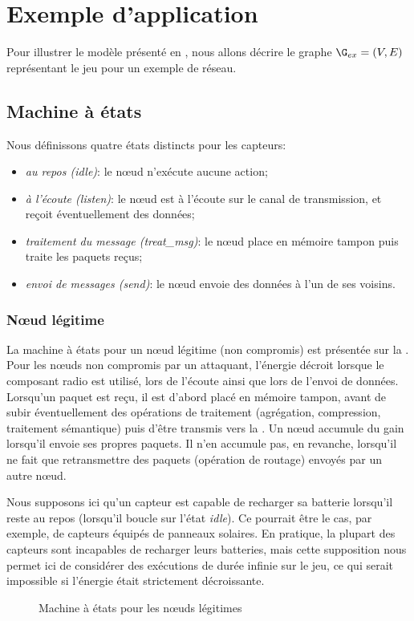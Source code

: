 \section{Exemple d'application}
\label{tj:sec:example}
Pour illustrer le modèle présenté en , nous allons décrire le graphe $\G_{ex} = (V,E)$ représentant le jeu pour un exemple de réseau.

    \subsection{Machine à états}

Nous définissons quatre états distincts pour les capteurs:
\begin{itemize}
    \item \emph{au repos (idle)}: le nœud n'exécute aucune action;
    \item \emph{à l'écoute (listen)}: le nœud est à l'écoute sur le canal de transmission, et reçoit éventuellement des données;
    \item \emph{traitement du message (treat\_msg)}: le nœud place en mémoire tampon puis traite les paquets reçus;
    \item \emph{envoi de messages (send)}: le nœud envoie des données à l'un de ses voisins.
\end{itemize}

        \subsubsection{Nœud légitime}
La machine à états pour un nœud légitime (non compromis) est présentée sur la .
Pour les nœuds non compromis par un attaquant, l'énergie décroit lorsque le composant radio est utilisé, \cad lors de l'écoute ainsi que lors de l'envoi de données.
Lorsqu'un paquet est reçu, il est d'abord placé en mémoire tampon, avant de subir éventuellement des opérations de traitement (agrégation, compression, traitement sémantique) puis d'être transmis vers la \sdb.
Un nœud accumule du gain lorsqu'il envoie ses propres paquets.
Il n'en accumule pas, en revanche, lorsqu'il ne fait que retransmettre des paquets (opération de routage) envoyés par un autre nœud.

Nous supposons ici qu'un capteur est capable de recharger sa batterie lorsqu'il reste au repos (\cad lorsqu'il boucle sur l'état \emph{idle}).
Ce pourrait être le cas, par exemple, de capteurs équipés de panneaux solaires.
En pratique, la plupart des capteurs sont incapables de recharger leurs batteries, mais cette supposition nous permet ici de considérer des exécutions de durée infinie sur le jeu, ce qui serait impossible si l'énergie était strictement décroissante.
\begin{figure}[H]
    \centering
    
    \caption{Machine à états pour les nœuds légitimes}\label{tj:fig:autGoodNode}
\end{figure}


